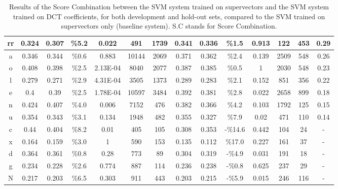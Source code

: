 \begin{table}[H]
{\begin{tabular}{|c| |c|c|c|c|c|c| |c|c|c|c|c|c| |c|}
\rowcolor{lightgray} rr & 0.324 & 0.307 & \%5.2 & 0.022 & 491 & 1739 & 0.341 & 0.336 & \%1.5 & 0.913 & 122 & 453 & 0.29 \\ \hline
a & 0.346 & 0.344 & \%0.6 & 0.883 & 10144 & 2069 & 0.371 & 0.362 & \%2.4 & 0.139 & 2509 & 548 & 0.26 \\ \hline
\rowcolor{lightgray} o & 0.408 & 0.398 & \%2.5 & 2.13E-04 & 8040 & 2077 & 0.387 & 0.385 & \%0.5 & 1 & 2030 & 548 & 0.23 \\ \hline
\rowcolor{lightgray} l & 0.279 & 0.271 & \%2.9 & 4.31E-04 & 3505 & 1373 & 0.289 & 0.283 & \%2.1 & 0.152 & 851 & 356 & 0.22 \\ \hline
\rowcolor{lightgray} e & 0.4 & 0.39 & \%2.5 & 1.78E-04 & 10597 & 3484 & 0.392 & 0.381 & \%2.8 & 0.022 & 2658 & 899 & 0.18 \\ \hline
\rowcolor{lightgray} n & 0.424 & 0.407 & \%4.0 & 0.006 & 7152 & 476 & 0.382 & 0.366 & \%4.2 & 0.103 & 1792 & 125 & 0.15 \\ \hline
u & 0.354 & 0.343 & \%3.1 & 0.134 & 1948 & 482 & 0.355 & 0.327 & \%7.9 & 0.02 & 471 & 110 & 0.14 \\ \hline
c & 0.44 & 0.404 & \%8.2 & 0.01 & 405 & 105 & 0.308 & 0.353 & -\%14.6 & 0.442 & 104 & 24 & - \\ \hline
x & 0.164 & 0.159 & \%3.0 & 1 & 590 & 153 & 0.135 & 0.112 & \%17.0 & 0.227 & 161 & 37 & - \\ \hline
d & 0.364 & 0.361 & \%0.8 & 0.28 & 773 & 89 & 0.304 & 0.319 & -\%4.9 & 0.031 & 191 & 18 & - \\ \hline
g & 0.234 & 0.228 & \%2.6 & 0.774 & 887 & 114 & 0.236 & 0.238 & -\%0.8 & 0.625 & 237 & 29 & - \\ \hline
N & 0.217 & 0.203 & \%6.5 & 0.303 & 911 & 443 & 0.203 & 0.215 & -\%5.9 & 0.015 & 246 & 116 & - \\ \hline
\end{tabular}

}
\caption{Results of the Score Combination between the SVM system trained on supervectors
and the SVM system trained on DCT coefficients, for both development and hold-out sets,
compared to the SVM trained on supervectors only (baseline system). S.C stands for
Score Combination.}
\label{tab:scoreCombinationAppendixTable}
\end{table}

